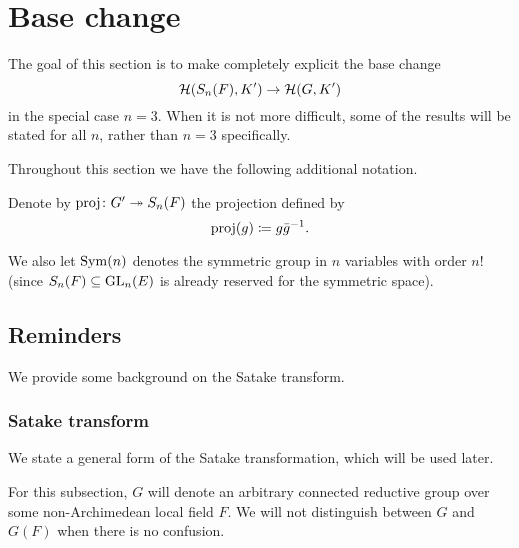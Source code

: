 \section{Base change}
\label{sec:satake}

The goal of this section is to make completely explicit the base change
\[ \mathcal H(S_n(F), K') \to \mathcal H(G, K') \]
in the special case $n = 3$.
When it is not more difficult, some of the results will be stated for all $n$,
rather than $n = 3$ specifically.

Throughout this section we have the following additional notation.
\begin{definition}
  Denote by $\operatorname{proj} \colon G' \twoheadrightarrow S_n(F)$ the projection defined by
  \[ \operatorname{proj}(g) \coloneqq g \bar{g}^{-1}. \]
\end{definition}
We also let $\operatorname{Sym}(n)$ denotes the symmetric group in $n$ variables with order $n!$
(since $S_n(F) \subseteq \operatorname{GL}_n(E)$ is already reserved for the symmetric space).

\subsection{Reminders}
We provide some background on the Satake transform.

\subsubsection{Satake transform}
We state a general form of the Satake transformation, which will be used later.

For this subsection, $G$ will denote an arbitrary connected reductive group
over some non-Archimedean local field $F$.
We will not distinguish between $G$ and $G(F)$ when there is no confusion.

